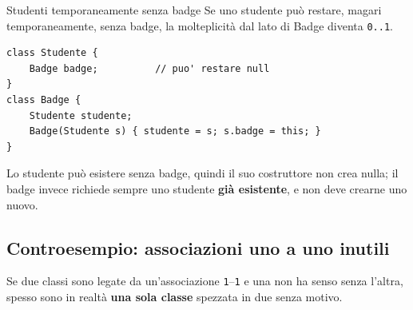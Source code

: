 \begin{esempio}{Studenti temporaneamente senza badge}
Se uno studente può restare, magari temporaneamente, senza badge, la molteplicità dal lato di Badge diventa \texttt{0..1}.

\begin{center}
\end{center}

\begin{lstlisting}[style=java]
class Studente {
    Badge badge;          // puo' restare null
}
class Badge {
    Studente studente;
    Badge(Studente s) { studente = s; s.badge = this; }
}
\end{lstlisting}
Lo studente può esistere senza badge, quindi il suo costruttore non crea nulla; il badge invece richiede sempre uno studente
\textbf{già esistente}, e non deve crearne uno nuovo.
\end{esempio}

\subsection{Controesempio: associazioni uno a uno inutili}

\begin{center}
\end{center}

Se due classi sono legate da un'associazione \texttt{1}--\texttt{1} e una non ha senso senza l'altra, spesso sono in realtà
\textbf{una sola classe} spezzata in due senza motivo.

